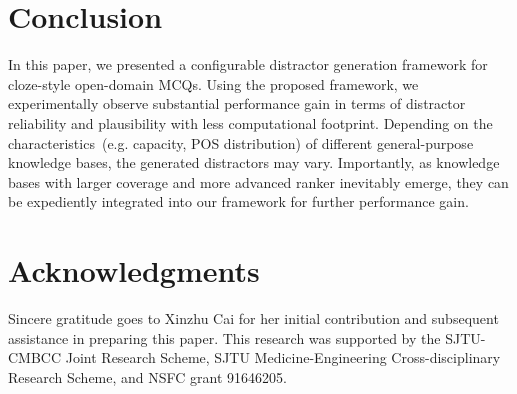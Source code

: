 \section{Conclusion}
\label{sec:conclusion}
In this paper, we presented a configurable distractor generation framework for cloze-style open-domain MCQs. 
Using the proposed framework, we experimentally observe substantial performance gain in terms of distractor reliability and plausibility with less computational footprint. Depending on the characteristics~(e.g. capacity, POS distribution) of different general-purpose knowledge bases, the generated distractors may vary. Importantly, as knowledge bases with larger coverage and more advanced ranker inevitably emerge, they can be expediently integrated into our framework for further performance gain.

\section*{Acknowledgments}
Sincere gratitude goes to Xinzhu Cai for her initial
contribution and subsequent assistance in preparing this paper.
This research was supported by the SJTU-CMBCC Joint Research Scheme,
SJTU Medicine-Engineering Cross-disciplinary Research Scheme, and NSFC
grant 91646205.

